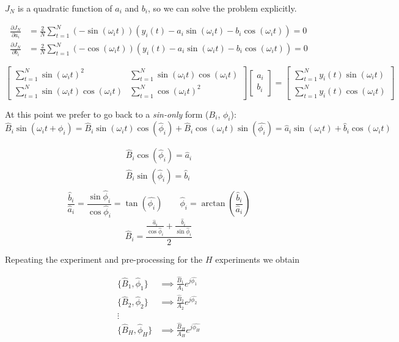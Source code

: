 $J_N$ is a quadratic function of $a_i$ and $b_i$, so we can solve the problem explicitly.

\begin{align*}
    \frac{\partial J_N}{\partial a_i} &= \frac{2}{N} \sum_{t=1}^N (-\sin(\omega_it))(y_i(t) - a_i\sin(\omega_it)-b_i\cos(\omega_it)) = 0 \\
    \frac{\partial J_N}{\partial b_i} &= \frac{2}{N} \sum_{t=1}^N (-\cos(\omega_it))(y_i(t) - a_i\sin(\omega_it)-b_i\cos(\omega_it)) = 0
\end{align*}

\[
    \begin{bmatrix}
        \sum_{t=1}^N \sin(\omega_it)^2 & \sum_{t=1}^N \sin(\omega_it)\cos(\omega_it) \\
        \sum_{t=1}^N \sin(\omega_it)\cos(\omega_it) & \sum_{t=1}^N \cos(\omega_it)^2
    \end{bmatrix}
    \begin{bmatrix}
        a_i \\ b_i
    \end{bmatrix} =
    \begin{bmatrix}
        \sum_{t=1}^N y_i(t)\sin(\omega_it) \\
        \sum_{t=1}^N y_i(t)\cos(\omega_it)
    \end{bmatrix}
\]

At this point we prefer to go back to a \emph{sin-only} form ($B_i$, $\phi_i$):
\[
    \hat{B}_i\sin(\omega_it + \phi_i) = \hat{B}_i\sin(\omega_it)\cos(\hat{\phi}_i) + \hat{B}_i\cos(\omega_it)\sin(\hat{\phi_i}) = \hat{a}_i\sin(\omega_it) + \hat{b}_i\cos(\omega_it)
\]

\begin{align*}
    \hat{B}_i\cos(\hat{\phi}_i) = \hat{a}_i \\
    \hat{B}_i\sin(\hat{\phi}_i) = \hat{b}_i \\
\end{align*}
\[
    \frac{\hat{b}_i}{\hat{a}_i} = \frac{\sin\hat{\phi}_i}{\cos{\hat{\phi}_i}} = \tan(\hat{\phi_i}) \qquad \hat{\phi}_i = \arctan \left( \frac{\hat{b}_i}{\hat{a}_i} \right)
\]
\[
    \hat{B}_i = \frac{\frac{\hat{a}_i}{\cos\hat{\phi}_i} + \frac{\hat{b}_i}{\sin\hat{\phi}_i}}{2}
\]

Repeating the experiment and pre-processing for the $H$ experiments we obtain

\begin{align*}
    \{ \hat{B}_1, \hat{\phi}_1 \} &\implies \frac{\hat{B}_1}{A_1} e^{j\hat{\phi_1}} \\
    \{ \hat{B}_2, \hat{\phi}_2 \} &\implies \frac{\hat{B}_2}{A_2} e^{j\hat{\phi_2}} \\
    \vdots& \\
    \{ \hat{B}_H, \hat{\phi}_H \} &\implies \frac{\hat{B}_H}{A_H} e^{j\hat{\phi_H}} \\
\end{align*}

